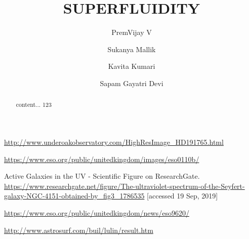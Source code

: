 \documentclass[11pt]{report}
\title{SUPERFLUIDITY}
\author[1]{ PremVijay V}
\author[1]{	Sukanya Mallik}
\author[1]{	Kavita Kumari}
\author[1]{	Sapam Gayatri Devi}
\affil[1]{The Inter-University Centre for Astronomy and Astrophysics}
\begin{document}
\maketitle

\begin{abstract}
	content... 123
\end{abstract}

\begin{thebibliography}{9}
	
	\url{http://www.underoakobservatory.com/HighResImage_HD191765.html}
	
	\url{https://www.eso.org/public/unitedkingdom/images/eso0110b/}
	
	Active Galaxies in the UV - Scientific Figure on ResearchGate. \url{https://www.researchgate.net/figure/The-ultraviolet-spectrum-of-the-Seyfert-galaxy-NGC-4151-obtained-by_fig3_1786535} [accessed 19 Sep, 2019]
	
	\url{https://www.eso.org/public/unitedkingdom/news/eso9620/}
	
	\url{http://www.astrosurf.com/buil/lulin/result.htm}
	
	
	
	
\end{thebibliography}
\end{document}
